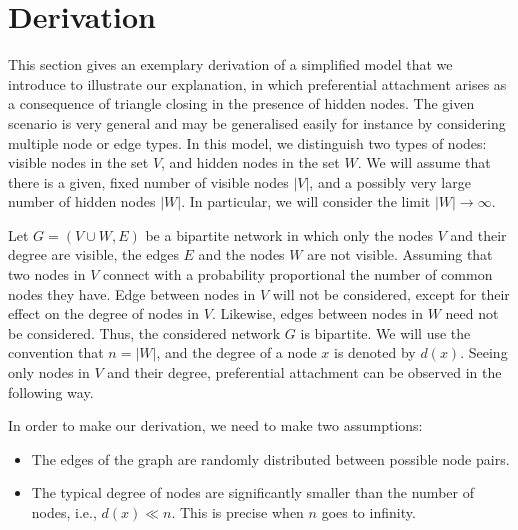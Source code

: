 \documentclass{jimis}
\begin{document}
\section{Derivation}
This section gives an exemplary derivation of a simplified model that we
introduce to illustrate our explanation, in 
which preferential 
attachment arises as a consequence of triangle closing in the presence
of hidden nodes.  The given scenario is very general and may be generalised
easily for instance by considering multiple node or edge types.  
In this model, we distinguish two types of nodes:  visible nodes in the set $V$,
and hidden nodes in the set $W$.  We will assume that there is a given,
fixed number of visible nodes $|V|$, and a possibly very large number of
hidden nodes $|W|$.  In particular, we will consider the limit $|W|
\rightarrow \infty$. 


Let $G=(V \cup W, E)$ be a bipartite network in which only the nodes $V$
and their degree are visible, the edges $E$ and the nodes $W$ are not
visible.  Assuming that two nodes in $V$ connect with a probability
proportional the number of common nodes they have.  Edge between nodes
in $V$ will not be considered, except for their effect on the degree of
nodes in $V$.  Likewise, edges between nodes in $W$ need not be
considered.  Thus, the considered network $G$ is bipartite. 
We will use the convention that $n = |W|$, and the degree of a node $x$ is
denoted by $d(x)$. 
Seeing only nodes in $V$ and their degree, preferential attachment can
be observed in the following way. 

In order to make our derivation, we need to make two assumptions:
\begin{itemize}
  \item The edges of the graph are randomly distributed between possible
    node pairs.
  \item The typical degree of nodes are significantly smaller than the
    number of nodes, i.e., $d(x) \ll n$.  This is precise when $n$ goes
    to infinity.  
\end{itemize}
\end{document}
